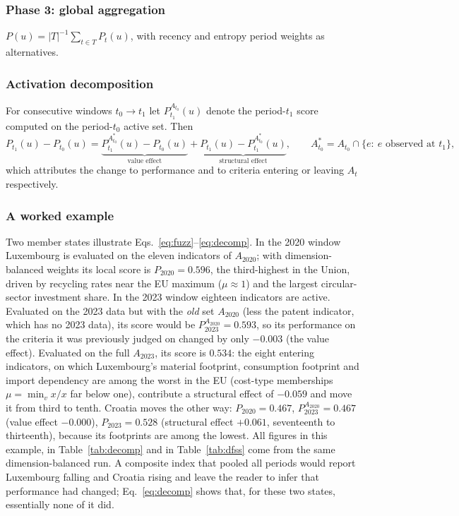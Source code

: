 \documentclass[a4paper,fleqn]{cas-sc}
\begin{document}
\subsubsection{Phase 3: global aggregation} $P(u)=|T|^{-1}\sum_{t\in T}P_t(u)$, with recency and entropy period weights as alternatives.

\subsubsection{Activation decomposition} For consecutive windows $t_0\to t_1$ let $P^{A_{t_0}}_{t_1}(u)$ denote the period-$t_1$ score computed on the period-$t_0$ active set. Then
\begin{equation}
P_{t_1}(u)-P_{t_0}(u)=\underbrace{P^{A^{*}_{t_0}}_{t_1}(u)-P_{t_0}(u)}_{\text{value effect}}+\underbrace{P_{t_1}(u)-P^{A^{*}_{t_0}}_{t_1}(u)}_{\text{structural effect}},\qquad A^{*}_{t_0}=A_{t_0}\cap\{e:\ e\text{ observed at }t_1\},\label{eq:decomp}
\end{equation}
which attributes the change to performance and to criteria entering or leaving $A_t$ respectively.

\subsubsection{A worked example} Two member states illustrate Eqs.~\eqref{eq:fuzz}--\eqref{eq:decomp}. In the 2020 window Luxembourg is evaluated on the eleven indicators of $A_{2020}$; with dimension-balanced weights its local score is $P_{2020}=0.596$, the third-highest in the Union, driven by recycling rates near the EU maximum ($\mu\approx1$) and the largest circular-sector investment share. In the 2023 window eighteen indicators are active. Evaluated on the 2023 data but with the \emph{old} set $A_{2020}$ (less the patent indicator, which has no 2023 data), its score would be $P^{A_{2020}}_{2023}=0.593$, so its performance on the criteria it was previously judged on changed by only $-0.003$ (the value effect). Evaluated on the full $A_{2023}$, its score is $0.534$: the eight entering indicators, on which Luxembourg's material footprint, consumption footprint and import dependency are among the worst in the EU (cost-type memberships $\mu=\min_v x/x$ far below one), contribute a structural effect of $-0.059$ and move it from third to tenth. Croatia moves the other way: $P_{2020}=0.467$, $P^{A_{2020}}_{2023}=0.467$ (value effect $-0.000$), $P_{2023}=0.528$ (structural effect $+0.061$, seventeenth to thirteenth), because its footprints are among the lowest. All figures in this example, in Table~\ref{tab:decomp} and in Table~\ref{tab:dfss} come from the same dimension-balanced run. A composite index that pooled all periods would report Luxembourg falling and Croatia rising and leave the reader to infer that performance had changed; Eq.~\eqref{eq:decomp} shows that, for these two states, essentially none of it did.
\end{document}
